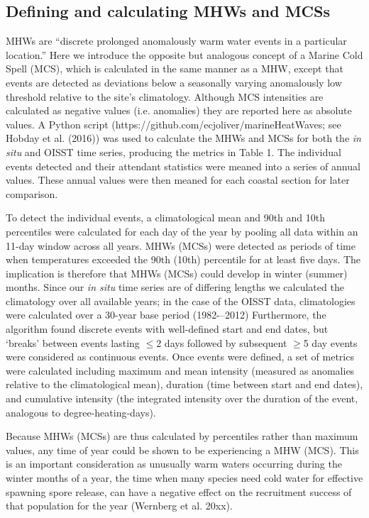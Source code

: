 \documentclass[a4paper,10pt,review]{elsarticle}
\begin{document}
\subsection{Defining and calculating MHWs and MCSs}
MHWs are ``discrete prolonged anomalously warm water events in a particular location.'' Here we introduce the opposite but analogous concept of a Marine Cold Spell (MCS), which is calculated in the same manner as a MHW, except that events are detected as deviations below a seasonally varying anomalously low threshold relative to the site’s climatology. Although MCS intensities are calculated as negative values (i.e. anomalies) they are reported here as absolute values.
A Python script (https://github.com/ecjoliver/marineHeatWaves; see Hobday et al. (2016)) was used to calculate the MHWs and MCSs for both the \emph{in situ} and OISST time series, producing the metrics in Table 1. The individual events detected and their attendant statistics were meaned into a series of annual values. These annual values were then meaned for each coastal section for later comparison.

To detect the individual events, a climatological mean and 90th and 10th percentiles were calculated for each day of the year by pooling all data within an 11-day window across all years. MHWs (MCSs) were detected as periods of time when temperatures exceeded the 90th (10th) percentile for at least five days. The implication is therefore that MHWs (MCSs) could develop in winter (summer) months. Since our \emph{in situ} time series are of differing lengths we calculated the climatology over all available years; in the case of the OISST data, climatologies were calculated over a 30-year base period (1982-–2012) Furthermore, the algorithm found discrete events with well-defined start and end dates, but `breaks' between events lasting $\leq$2 days followed by subsequent $\geq$5 day events were considered as continuous events. Once events were defined, a set of metrics were calculated including maximum and mean intensity (measured as anomalies relative to the climatological mean), duration (time between start and end dates), and cumulative intensity (the integrated intensity over the duration of the event, analogous to degree-heating-days).

Because MHWs (MCSs) are thus calculated by percentiles rather than maximum values, any time of year could be shown to be experiencing a MHW (MCS). This is an important consideration as unusually warm waters occurring during the winter months of a year, the time when many species need cold water for effective spawning spore release, can have a negative effect on the recruitment success of that population for the year (Wernberg et al. 20xx).
\end{document}
